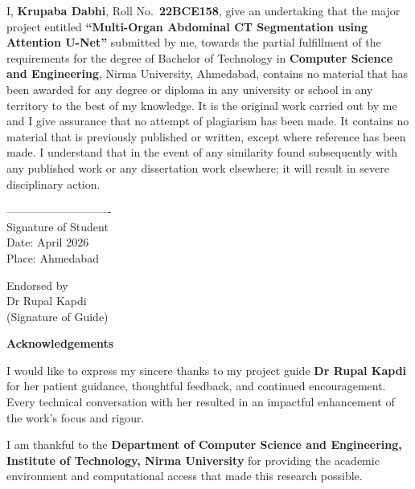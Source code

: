 \noindent I, \textbf{Krupaba Dabhi}, Roll No.\ \textbf{22BCE158}, give an undertaking that the
major project entitled \textbf{``Multi-Organ Abdominal CT Segmentation using Attention U-Net''}
submitted by me, towards the partial fulfillment of the requirements for the degree of Bachelor of
Technology in \textbf{Computer Science and Engineering}, Nirma University, Ahmedabad, contains no
material that has been awarded for any degree or diploma in any university or school in any territory
to the best of my knowledge. It is the original work carried out by me and I give assurance that no
attempt of plagiarism has been made. It contains no material that is previously published or written,
except where reference has been made. I understand that in the event of any similarity found
subsequently with any published work or any dissertation work elsewhere; it will result in severe
disciplinary action.

\vspace{2cm}
\noindent ----------------------------\\
Signature of Student\\
Date: April 2026\\
Place: Ahmedabad\\

\begin{flushright}
Endorsed by \\
Dr Rupal Kapdi \\
(Signature of Guide)
\end{flushright}

\newpage
{}
\begin{center}
{\Large \bf Acknowledgements}\\
\end{center}
\vspace{10pt}

\noindent
I would like to express my sincere thanks to my project guide \textbf{Dr Rupal Kapdi} for her patient guidance, thoughtful feedback, and continued encouragement. Every technical conversation with her resulted in an impactful enhancement of the work's focus and rigour.

\noindent
I am thankful to the \textbf{Department of Computer Science and Engineering, Institute of Technology, Nirma University} for providing the academic environment and computational access that made this research possible.

